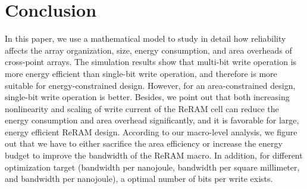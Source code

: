 \vspace{-5pt}
\section{Conclusion}\label{sec:conclusion}
In this paper, we use a mathematical model to study in detail how
reliability affects the array organization, size, energy consumption, and
area overheads of cross-point arrays. The simulation results show that
multi-bit write operation is more energy efficient than single-bit write
operation, and therefore is more suitable for energy-constrained design.
However, for an area-constrained design, single-bit write operation is
better. Besides, we point out that both increasing nonlinearity and
scaling of write current of the ReRAM cell can reduce the energy
consumption and area overhead significantly, and it is favorable for
large, energy efficient ReRAM design. According to our macro-level
analysis, we figure out that we have to either sacrifice the area
efficiency or increase the energy budget to improve the bandwidth of the
ReRAM macro. In addition, for different optimization target (bandwidth per
nanojoule, bandwidth per square millimeter, and bandwidth per nanojoule),
a optimal number of bits per write exists.
